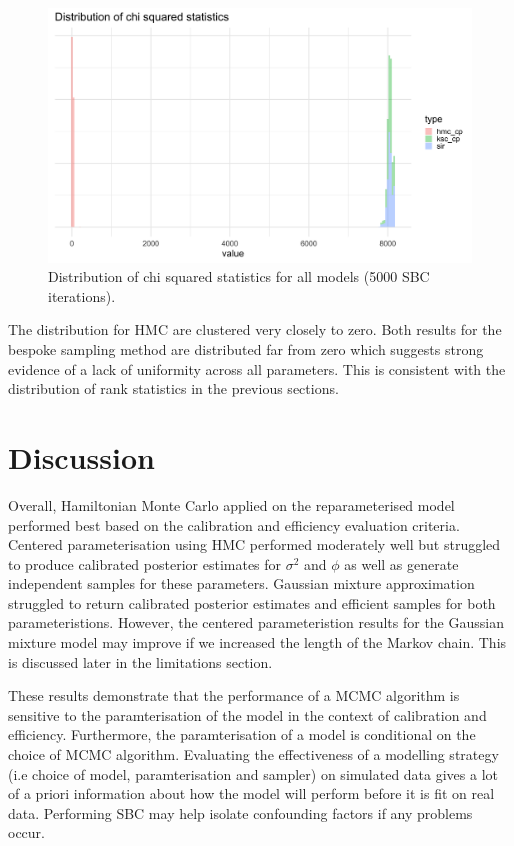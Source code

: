 \documentclass[12pt, a4paper]{article}
\begin{document}
    \begin{figure}[H]
        \centering
        \includegraphics[scale=0.1]{results/dist_chisq.png}
        \caption{Distribution of chi squared statistics for all models (5000 SBC iterations).}
        \label{fig:allchisq}
    \end{figure}

    The distribution for HMC are clustered very closely to zero. Both results for the bespoke sampling method are distributed far from zero which suggests strong evidence of a lack of uniformity across all parameters. This is consistent with the distribution of rank statistics in the previous sections. 

\section{Discussion}
Overall, Hamiltonian Monte Carlo applied on the reparameterised model performed best based on the calibration and efficiency evaluation criteria. Centered parameterisation using HMC performed moderately well but struggled to produce calibrated posterior estimates for $\sigma^2$ and $\phi$ as well as generate independent samples for these parameters. Gaussian mixture approximation struggled to return calibrated posterior estimates and efficient samples for both parameteristions. However, the centered parameteristion results for the Gaussian mixture model may improve if we increased the length of the Markov chain. This is discussed later in the limitations section. 

These results demonstrate that the performance of a MCMC algorithm is sensitive to the paramterisation of the model in the context of calibration and efficiency. Furthermore, the paramterisation of a model is conditional on the choice of MCMC algorithm. Evaluating the effectiveness of a modelling strategy (i.e choice of model, paramterisation and sampler) on simulated data gives a lot of a priori information about how the model will perform before it is fit on real data. Performing SBC may help isolate confounding factors if any problems occur. 
\end{document}
